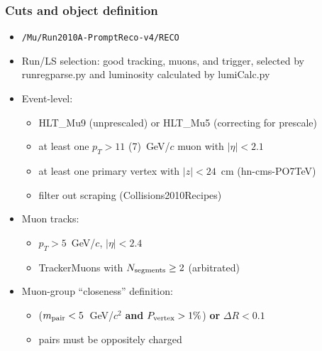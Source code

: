 \documentclass[compress]{beamer}
\newcommand{\s}[1]{{\mbox{\scriptsize #1}}}
\begin{document}
\begin{frame}
\frametitle{Cuts and object definition}
\begin{itemize}
\item {\tt /Mu/Run2010A-PromptReco-v4/RECO}

\item Run/LS selection: good tracking, muons, and trigger, selected by
  runregparse.py and luminosity calculated by lumiCalc.py

\item Event-level:
\begin{itemize}\setlength{\itemsep}{0.1 cm}
\item HLT\_Mu9 (unprescaled) or HLT\_Mu5 (correcting for prescale)
\item at least one $p_T > 11$ (7)~GeV/$c$ muon with $|\eta| < 2.1$
\item at least one primary vertex with $|z| < 24$~cm (hn-cms-PO7TeV)
\item filter out scraping (Collisions2010Recipes)
\end{itemize}

\item Muon tracks:
\begin{itemize}\setlength{\itemsep}{0.1 cm}
\item $p_T > 5$~GeV/$c$, $|\eta| < 2.4$
\item TrackerMuons with $N_\s{segments} \ge 2$ (arbitrated)
\end{itemize}

\item Muon-group ``closeness'' definition:
\begin{itemize}\setlength{\itemsep}{0.1 cm}
\item ($m_\s{pair} < 5$~GeV/$c^2$ {\bf and} $P_\s{vertex} > 1\%$) {\bf or} $\Delta R < 0.1$
\item pairs must be oppositely charged
\end{itemize}
\end{itemize}
\end{frame}
\end{document}
